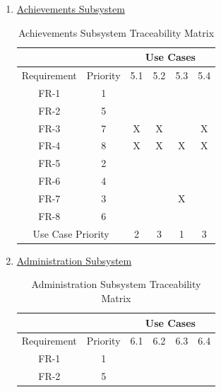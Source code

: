\documentclass{article}
\begin{document}
\begin{enumerate}
	\item \underline{Achievements Subsystem}
	\begin{table}[]
 \centering
 \caption{Achievements Subsystem Traceability Matrix}
 \label{my-label}
 \begin{tabular}{cc|c|c|c|c|}
 \cline{3-6}
                                   &          & \multicolumn{4}{c|}{Use Cases} \\ \hline
 \multicolumn{1}{|c|}{Requirement} & Priority & 5.1    & 5.2   & 5.3   & 5.4   \\ \hline
 \multicolumn{1}{|c|}{FR-1}        & 1        &        &       &       &       \\ \hline
 \multicolumn{1}{|c|}{FR-2}        & 5        &        &       &       &       \\ \hline
 \multicolumn{1}{|c|}{FR-3}        & 7        & X      & X     &       & X     \\ \hline
 \multicolumn{1}{|c|}{FR-4}        & 8        & X      & X     & X     & X     \\ \hline
 \multicolumn{1}{|c|}{FR-5}        & 2        &        &       &       &       \\ \hline
 \multicolumn{1}{|c|}{FR-6}        & 4        &        &       &       &       \\ \hline
 \multicolumn{1}{|c|}{FR-7}        & 3        &        &       & X     &       \\ \hline
 \multicolumn{1}{|c|}{FR-8}        & 6        &        &       &       &       \\ \hline
 \multicolumn{2}{|c|}{Use Case Priority}      & 2      & 3     & 1     & 3     \\ \hline
 \end{tabular}
 \end{table}
	\item \underline{Administration Subsystem}
			\begin{table}[]
 \centering
 \caption{Administration Subsystem Traceability Matrix}
 \label{my-label}
 \begin{tabular}{cc|c|c|c|c|}
 \cline{3-6}
                                   &          & \multicolumn{4}{c|}{Use Cases} \\ \hline
 \multicolumn{1}{|c|}{Requirement} & Priority & 6.1    & 6.2   & 6.3   & 6.4   \\ \hline
 \multicolumn{1}{|c|}{FR-1}        & 1        &        &       &       &       \\ \hline
 \multicolumn{1}{|c|}{FR-2}        & 5        &        &       &       &       \\ \hline

\end{tabular}
\end{table}
\end{enumerate}
\end{document}
